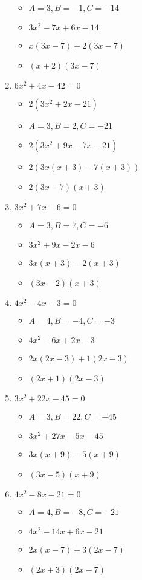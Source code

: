 \documentclass{article}
\begin{document}
\begin{enumerate}
\begin{itemize}
  \item $A=3, B=-1, C=-14$
  \item $3x^{2}-7x+6x-14$
  \item $x(3x-7)+2(3x-7)$
  \item $(x+2)(3x-7)$
  \end{itemize}
\item $6x^{2} + 4x - 42 = 0$
  \begin{itemize}
  \item $2(3x^{2}+2x-21)$
  \item $A=3, B=2, C=-21$
  \item $2(3x^{2}+9x-7x-21)$
  \item $2(3x(x+3)-7(x+3))$
  \item $2(3x-7)(x+3)$
  \end{itemize}
\item $3x^{2} + 7x - 6 = 0$
  \begin{itemize}
  \item $A=3, B=7, C=-6$
  \item $3x^{2}+9x-2x-6$
  \item $3x(x+3)-2(x+3)$
  \item $(3x-2)(x+3)$
  \end{itemize}
\item $4x^{2} - 4x - 3 = 0$
  \begin{itemize}
  \item $A=4, B=-4, C=-3$
  \item $4x^{2}-6x+2x-3$
  \item $2x(2x-3)+1(2x-3)$
  \item $(2x+1)(2x-3)$
  \end{itemize}
\item $3x^{2} + 22x - 45 = 0$
  \begin{itemize}
  \item $A=3, B=22, C=-45$
  \item $3x^{2}+27x-5x-45$
  \item $3x(x+9)-5(x+9)$
  \item $(3x-5)(x+9)$
  \end{itemize}
\item $4x^{2} - 8x - 21 = 0$
  \begin{itemize}
  \item $A=4, B=-8, C=-21$
  \item $4x^{2}-14x+6x-21$
  \item $2x(x-7)+3(2x-7)$
  \item $(2x+3)(2x-7)$

\end{itemize}
\end{enumerate}
\end{document}
